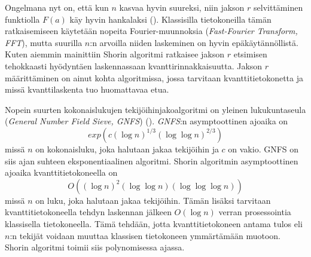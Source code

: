 \iffalse
Algoritmi jolla Shorin algoritmi jakaa luvun $n$ on seuraavanlainen (\cite{doi:10.1080/23742917.2016.1226650}):
\begin{enumerate}

    \item Valitaan satunnainen luku väliltä $x \in \{2, \ldots, n-1\}$
    
    \item Tutkitaan ovatko $x$ ja $n$ suhteellisia alkulukuja\footnote{ks. kappale 2.3} keskenään eli jos $syt(x,n) = 1$, mennään kohtaan 3. Muuten olemme löytäneet toisen tekijöistä.
    
    \item Etsitään funktion $f(x) = x^{a} \mod n$ jakso $r$, missä $a = \mathbb{N}$. Jakson $r$ löytäminen toimii siten, että yhtälöä $f(x) = x^{a} \mod n$ kokeillaan kasvavilla $a$:n arvoilla kunnes löydetään $a$:n arvo jolla yhtälön ratkaisut alkavat toistua.
    
    \item Jos jakso $r$ oli parillinen, niin jatketaan eteenpäin kohtaan 4. Muuten palataan kohtaan 1. ja valitaan uusi satunnainen luku.
    
    \item Lasketaan \[d = max \{syt(x^{r/2}-1,n), syt(x^{r/2}+1,n) \} \]
    
    \item Jos $d \neq 1$, olemme löytäneet tekijän jomman kumman tekijän. Muuten palataan kohtaan 1.
\end{enumerate}
\fi

Ongelmana nyt on, että kun $n$ kasvaa hyvin suureksi, niin jakson $r$ selvittäminen funktiolla $F(a)$ käy hyvin hankalaksi (\cite{doi:10.1080/23742917.2016.1226650}). Klassisilla tietokoneilla tämän ratkaisemiseen käytetään nopeita Fourier-muunnoksia (\emph{Fast-Fourier Transform, FFT}), mutta suurilla $n$:n arvoilla niiden laskeminen on hyvin epäkäytännöllistä. Kuten aiemmin mainittiin Shorin algoritmi ratkaisee jakson $r$ etsimisen tehokkaasti hyödyntäen laskennassaan kvanttirinnakkaisuutta. Jakson $r$ määrittäminen on ainut kohta algoritmissa, jossa tarvitaan kvanttitietokonetta ja missä kvanttilaskenta tuo huomattavaa etua.

Nopein suurten kokonaislukujen tekijöihinjakoalgoritmi on yleinen lukukuntaseula (\emph{General Number Field Sieve, GNFS}) (\cite{doi:10.1137/S0036144598347011}). \emph{GNFS}:n asymptoottinen ajoaika on \[exp(c(\log n)^{1/3} (\log \log n)^{2/3})\] missä $n$ on kokonaisluku, joka halutaan jakaa tekijöihin ja $c$ on vakio. GNFS on siis ajan suhteen eksponentiaalinen algoritmi. Shorin algoritmin asymptoottinen ajoaika kvanttitietokoneella on \[O((\log n)^{2}(\log \log n) (\log \log \log n))\] missä $n$ on luku, joka halutaan jakaa tekijöihin. Tämän lisäksi tarvitaan kvanttitietokoneella tehdyn laskennan jälkeen $O(\log n)$ verran prosessointia klassisella tietokoneella. Tämä tehdään, jotta kvanttitietokoneen antama tulos eli $n$:n tekijät voidaan muuttaa klassisen tietokoneen ymmärtämään muotoon. Shorin algoritmi toimii siis polynomisessa ajassa.

